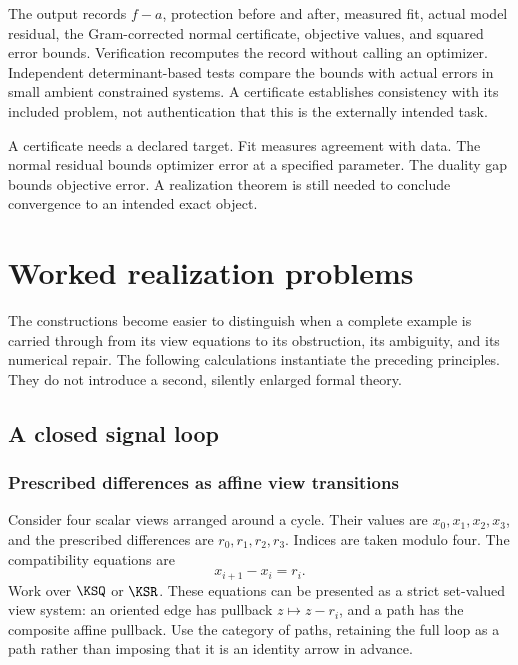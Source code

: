 The output records $f-a$, protection before and after, measured fit, actual model residual, the Gram-corrected normal certificate, objective values, and squared error bounds. Verification recomputes the record without calling an optimizer. Independent determinant-based tests compare the bounds with actual errors in small ambient constrained systems. A certificate establishes consistency with its included problem, not authentication that this is the externally intended task.

\begin{insight}
A certificate needs a declared target. Fit measures agreement with data. The normal residual bounds optimizer error at a specified parameter. The duality gap bounds objective error. A realization theorem is still needed to conclude convergence to an intended exact object.
\end{insight}




\chapter{Worked realization problems}\label{KS:book:chapter-24}
The constructions become easier to distinguish when a complete example is carried through from its view equations to its obstruction, its ambiguity, and its numerical repair. The following calculations instantiate the preceding principles. They do not introduce a second, silently enlarged formal theory.

\section{A closed signal loop}\label{KS:sec:signal-loop}
\subsection{Prescribed differences as affine view transitions}
Consider four scalar views arranged around a cycle. Their values are \(x_0,x_1,x_2,x_3\), and the prescribed differences are \(r_0,r_1,r_2,r_3\). Indices are taken modulo four. The compatibility equations are
\begin{equation}\label{KS:eq:cycle-difference}
 x_{i+1}-x_i=r_i.
\end{equation}
Work over \(\KSQ\) or \(\KSR\). These equations can be presented as a strict set-valued view system: an oriented edge has pullback \(z\mapsto z-r_i\), and a path has the composite affine pullback. Use the category of paths, retaining the full loop as a path rather than imposing that it is an identity arrow in advance.

